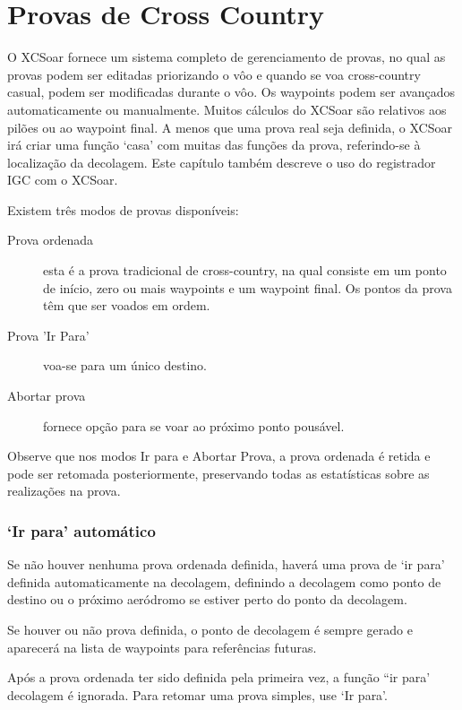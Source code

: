 \chapter{Provas de Cross Country}\label{cha:tasks}

O XCSoar fornece um sistema completo de gerenciamento de provas, no qual as provas podem ser editadas priorizando o vôo e quando se voa cross-country casual, podem ser modificadas durante o vôo.  Os waypoints podem ser avançados automaticamente ou manualmente.  Muitos cálculos do XCSoar são relativos aos pilões ou ao waypoint final.  A menos que uma prova real seja definida, o XCSoar irá criar uma função ‘casa’ com muitas das funções da prova, referindo-se à localização da decolagem.  Este capítulo também descreve o uso do registrador IGC com o XCSoar.

Existem três modos de provas disponíveis:

\begin{description}
\item[Prova ordenada] esta é a prova tradicional de cross-country, na qual consiste em um ponto de início, zero ou mais waypoints e um waypoint final.  Os pontos da prova têm que ser voados em ordem.
\item[Prova 'Ir Para'] voa-se para um único destino.
\item[Abortar prova] fornece opção para se voar ao próximo ponto pousável.
\end{description}

Observe que nos modos Ir para e Abortar Prova, a prova ordenada é retida e pode ser retomada posteriormente, preservando todas as estatísticas sobre as realizações na prova.

\subsection*{‘Ir para’ automático}

Se não houver nenhuma prova ordenada definida, haverá uma prova de ‘ir para’ definida automaticamente na decolagem, definindo a decolagem como ponto de destino ou o próximo aeródromo se estiver perto do ponto da decolagem.

Se houver ou não prova definida, o ponto de decolagem é sempre gerado e aparecerá na lista de waypoints para referências futuras.

Após a prova ordenada ter sido definida pela primeira vez, a função “ir para’ decolagem é ignorada.  Para retomar uma prova simples, use ‘Ir para’.


